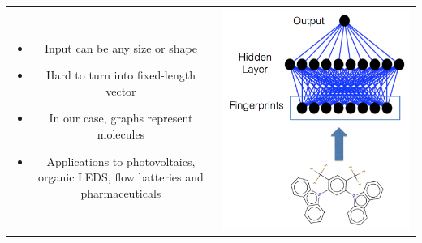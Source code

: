 \documentclass[landscape,a0b,final,a4resizeable]{include/a0poster}
\begin{document}
\begin{poster}
\begin{multicols}{3}
\begin{tabular}{cc}
\begin{minipage}[c]{0.45\columnwidth}
\begin{itemize}
  \item Input can be any size or shape
  \item Hard to turn into fixed-length vector
  \item In our case, graphs represent molecules
  \item Applications to photovoltaics, organic LEDS, flow batteries and pharmaceuticals
\end{itemize}
\end{minipage} & 
\begin{minipage}[c]{0.55\columnwidth}
\centerline{\includegraphics[width=1.0\columnwidth, clip, trim=4mm 0mm 4mm 4mm]{figures/how-fingerprints.png}}
\end{minipage}
\end{tabular}


\vspace{1.5in}


\end{multicols}
\end{poster}
\end{document}
